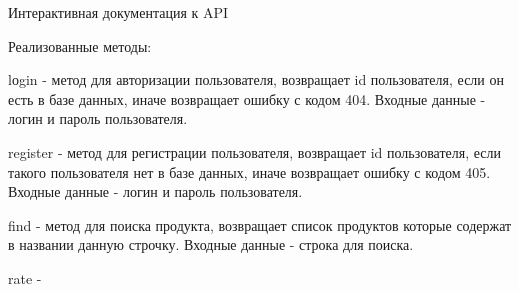 \begin{image}
	\caption{Интерактивная документация к API}
	\label{fig:docsApi}
\end{image}

Реализованные методы:

lоgin - метод для авторизации пользователя, возвращает id пользователя, если он есть в базе данных, иначе возвращает
ошибку с кодом 404.
Входные данные - логин и пароль пользователя.

register - метод для регистрации пользователя, возвращает id пользователя, если такого пользователя нет в базе данных,
иначе возвращает ошибку с кодом 405.
Входные данные - логин и пароль пользователя.

find - метод для поиска продукта, возвращает список продуктов которые содержат в названии данную строчку.
Входные данные - строка для поиска.

rate -